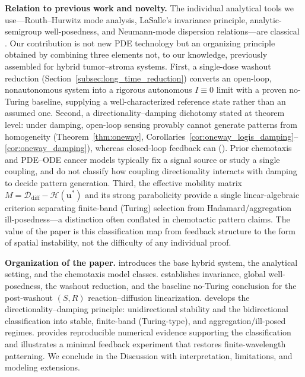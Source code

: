 \documentclass[pdflatex,sn-mathphys-ay]{sn-jnl}
\theoremstyle{thmstyleone}
\theoremstyle{definition}
\theoremstyle{remark}
\begin{document}
\medskip
\noindent\textbf{Relation to previous work and novelty.}
The individual analytical tools we use---Routh--Hurwitz mode analysis, LaSalle's
invariance principle, analytic-semigroup well-posedness, and Neumann-mode
dispersion relations---are classical \citep{murray2003mathematical}. Our
contribution is not new PDE technology but an organizing principle obtained by
combining three elements not, to our knowledge, previously assembled for hybrid
tumor--stroma systems. First, a single-dose washout reduction
(Section~\ref{subsec:long_time_reduction}) converts an open-loop, nonautonomous
system into a rigorous autonomous $I\equiv0$ limit with a proven no-Turing
baseline, supplying a well-characterized reference state rather than an assumed
one. Second, a directionality--damping dichotomy stated at theorem level:
under damping, open-loop sensing provably cannot generate patterns from
homogeneity (Theorem~\ref{thm:oneway}, Corollaries~\ref{cor:oneway_logis_damping}--\ref{cor:oneway_damping}), whereas closed-loop feedback can
(). Prior chemotaxis and PDE--ODE cancer models
\citep{wang2010chemotaxis,bubba2019chemotaxis,fernandez2022glioblastoma,stinner2014global}
typically fix a signal source or study a single coupling, and do not classify how
coupling directionality interacts with damping to decide pattern
generation. Third, the effective mobility matrix $M=\mathcal D_{\mathrm{diff}}-\mathcal H(\mathbf u^*)$ and its strong
parabolicity provide a single linear-algebraic criterion separating finite-band
(Turing) selection from Hadamard/aggregation ill-posedness---a distinction often
conflated in chemotactic pattern claims. The value of the paper is this
classification map from feedback structure to the form of spatial instability,
not the difficulty of any individual proof.

\medskip
\noindent\textbf{Organization of the paper.}
 introduces the base hybrid system, the analytical setting, and the chemotaxis model classes. 
 establishes invariance, global well-posedness, the washout reduction, and the baseline no-Turing conclusion for the post-washout $(S,R)$ reaction--diffusion linearization. 
 develops the directionality--damping principle: unidirectional stability and the bidirectional classification into stable, finite-band (Turing-type), and aggregation/ill-posed regimes. 
 provides reproducible numerical evidence supporting the classification and illustrates a minimal feedback experiment that restores finite-wavelength patterning. 
We conclude in the Discussion with interpretation, limitations, and modeling extensions.
\end{document}
